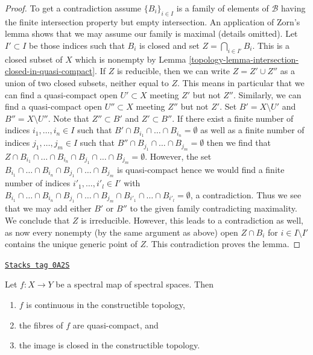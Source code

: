 \begin{proof}
\medskip\noindent
To get a contradiction assume $\{B_i\}_{i \in I}$ is a family
of elements of $\mathcal{B}$ having the finite intersection property
but empty intersection. An application of Zorn's lemma shows that we
may assume our family is maximal (details omitted).
Let $I' \subset I$ be those indices such that
$B_i$ is closed and set $Z = \bigcap_{i \in I'} B_i$.
This is a closed subset of $X$ which is nonempty by Lemma
\ref{topology-lemma-intersection-closed-in-quasi-compact}.
If $Z$ is reducible, then we can write $Z = Z' \cup Z''$
as a union of two closed subsets, neither equal to $Z$. This means in
particular that we can find a quasi-compact open $U' \subset X$ meeting
$Z'$ but not $Z''$. Similarly, we can find a quasi-compact open
$U'' \subset X$ meeting $Z''$ but not $Z'$. Set $B' = X \setminus U'$ and
$B'' = X \setminus U''$. Note that $Z'' \subset B'$ and $Z' \subset B''$.
If there exist a finite number of indices $i_1, \ldots, i_n \in I$ such
that $B' \cap B_{i_1} \cap \ldots \cap B_{i_n} = \emptyset$
as well as a finite number of indices $j_1, \ldots, j_m \in I$ such that
$B'' \cap B_{j_1} \cap \ldots \cap B_{j_m} = \emptyset$
then we find that
$Z \cap B_{i_1} \cap \ldots \cap B_{i_n} \cap B_{j_1} \cap \ldots \cap B_{j_m}
= \emptyset$.
However, the set
$B_{i_1} \cap \ldots \cap B_{i_n} \cap B_{j_1} \cap \ldots \cap B_{j_m}$
is quasi-compact hence we would find a finite number of
indices $i'_1, \ldots, i'_l \in I'$ with
$B_{i_1} \cap \ldots \cap B_{i_n} \cap B_{j_1} \cap \ldots \cap
B_{j_m} \cap B_{i'_1} \cap \ldots \cap B_{i'_l} = \emptyset$, a contradiction.
Thus we see that we may add either $B'$ or $B''$ to the given family
contradicting maximality. We conclude that $Z$ is irreducible. However,
this leads to a contradiction as well, as now every nonempty (by the
same argument as above) open $Z \cap B_i$ for $i \in I \setminus I'$
contains the unique generic point of $Z$. This contradiction proves the lemma.
\end{proof}

\begin{lemma}
\label{topology-lemma-fibres-spectral-map-quasi-compact}
\href{https://stacks.math.columbia.edu/tag/0A2S}{\texttt{Stacks tag 0A2S}}

Let $f : X \to Y$ be a spectral map of spectral spaces. Then
\begin{enumerate}
\item $f$ is continuous in the constructible topology,
\item the fibres of $f$ are quasi-compact, and
\item the image is closed in the constructible topology.
\end{enumerate}
\end{lemma}

